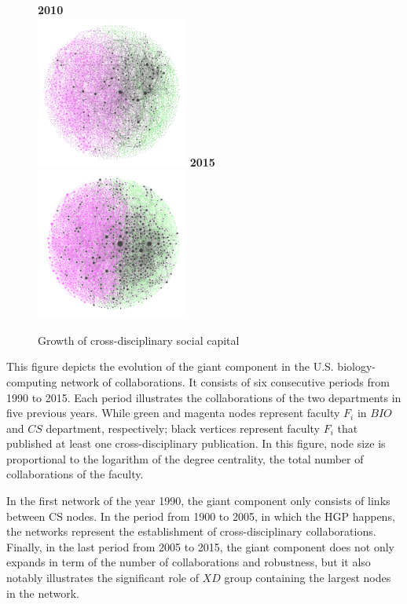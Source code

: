 \documentclass[10pt]{article}         %
\begin{document}
\begin{figure}[!htb]
  \endminipage\hfill
    \textbf{2010}\\
    \includegraphics[width=5cm, height=5cm]{Fig2A2010.png}
  \endminipage\hfill
    \textbf{2015}\\
    \includegraphics[width=5cm, height=5cm]{Fig2A2015.png}
  \endminipage
  \caption{Growth of cross-disciplinary social capital}
  \label{fig:2A}
\end{figure}

This figure depicts the evolution of the giant component in the U.S. biology-computing network of collaborations. It consists of six consecutive periods from 1990 to 2015. Each period illustrates the collaborations of the two departments in five previous years. While green and magenta nodes represent faculty $F_i$ in $BIO$ and $CS$ department, respectively; black vertices represent faculty $F_i$ that published at least one cross-disciplinary publication. In this figure, node size is proportional to the logarithm of the degree centrality, the total number of collaborations of the faculty.

In the first network of the year 1990, the giant component only consists of links between CS nodes. In the period from 1900 to 2005, in which the HGP happens, the networks represent the establishment of cross-disciplinary collaborations. Finally, in the last period from 2005 to 2015, the giant component does not only expands in term of the number of collaborations and robustness, but it also notably illustrates the significant role of $XD$ group containing the largest nodes in the network.
\end{document}
